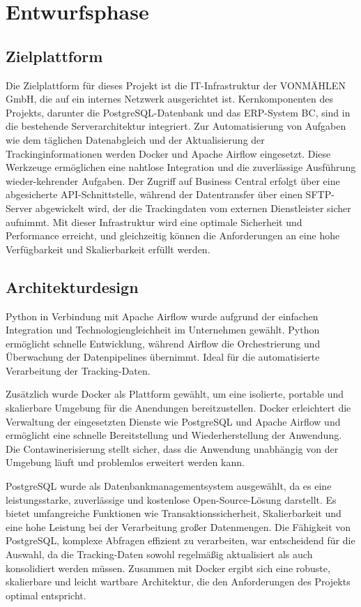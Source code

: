\section{Entwurfsphase} 
\label{sec:Entwurfsphase}

\subsection{Zielplattform}
\label{sec:Zielplattform} 
Die Zielplattform für dieses Projekt ist die IT-Infrastruktur der VONMÄHLEN GmbH, die auf ein internes Netzwerk 
ausgerichtet ist. Kernkomponenten des Projekts, darunter die PostgreSQL-Datenbank und das \ac{ERP}-System BC, sind in 
die bestehende Serverarchitektur integriert. Zur Automatisierung von Aufgaben wie dem täglichen Datenabgleich und 
der Aktualisierung der Trackinginformationen werden Docker und Apache Airflow eingesetzt. Diese Werkzeuge ermöglichen 
eine nahtlose Integration und die zuverlässige Ausführung wieder-kehrender Aufgaben. Der Zugriff auf Business Central 
erfolgt über eine abgesicherte \ac{API}-Schnittstelle, während der Datentransfer über einen SFTP-Server abgewickelt wird, 
der die Trackingdaten vom externen Dienstleister sicher aufnimmt. Mit dieser Infrastruktur wird eine optimale Sicherheit 
und Performance erreicht, und gleichzeitig können die Anforderungen an eine hohe Verfügbarkeit und Skalierbarkeit erfüllt 
werden.

\subsection{Architekturdesign}
\label{sec:Architekturdesign}
Python in Verbindung mit Apache Airflow wurde aufgrund der einfachen Integration und Technologiengleichheit im Unternehmen gewählt. 
Python ermöglicht schnelle Entwicklung, während Airflow die Orchestrierung und Überwachung der Datenpipelines übernimmt. Ideal für 
die automatisierte Verarbeitung der Tracking-Daten.

Zusätzlich wurde Docker als Plattform gewählt, um eine isolierte, portable und skalierbare Umgebung für die Anendungen bereitzustellen. 
Docker erleichtert die Verwaltung der eingesetzten Dienste wie PostgreSQL und Apache Airflow und ermöglicht eine schnelle Bereitstellung 
und Wiederherstellung der Anwendung. Die Contawinerisierung stellt sicher, dass die Anwendung unabhängig von der Umgebung läuft und 
problemlos erweitert werden kann.

PostgreSQL wurde als Datenbankmanagementsystem ausgewählt, da es eine leistungsstarke, zuverlässige und kostenlose Open-Source-Lösung darstellt. 
Es bietet umfangreiche Funktionen wie Transaktionssicherheit, Skalierbarkeit und eine hohe Leistung bei der Verarbeitung großer Datenmengen. 
Die Fähigkeit von PostgreSQL, komplexe Abfragen effizient zu verarbeiten, war entscheidend für die Auswahl, da die Tracking-Daten sowohl 
regelmäßig aktualisiert als auch konsolidiert werden müssen. Zusammen mit Docker ergibt sich eine robuste, skalierbare und leicht wartbare 
Architektur, die den Anforderungen des Projekts optimal entspricht.